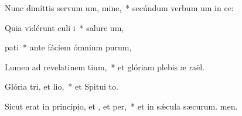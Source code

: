 \item Nunc dimíttis servum um, mine,~* secúndum verbum um in ce:
\item Quia vidérunt culi i~* salure um,
\item {} pati~* ante fáciem ómnium purum,
\item Lumen ad revelatinem tium,~* et glóriam plebis æ raël.
\item Glória tri, et lio,~* et Spitui to.
\item Sicut erat in princípio, et , et per,~* et in sǽcula sæcurum. men.
